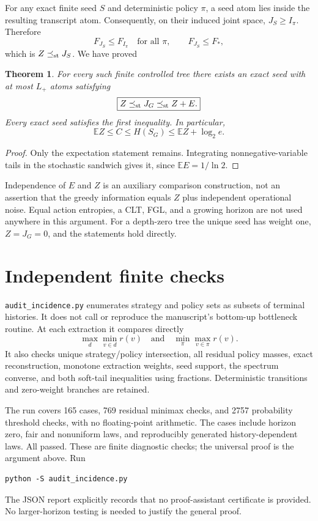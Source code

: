 \documentclass[11pt,a4paper]{article}
\newtheorem{theorem}[lemma]{Theorem}
\newcommand{\E}{\mathbb E}
\begin{document}
For any exact finite seed $S$ and deterministic policy $\pi$, a seed atom
lies inside the resulting transcript atom. Consequently, on their induced
joint space, $J_S\ge I_\pi$. Therefore
\[
F_{J_S}\le F_{I_\pi}\quad\text{for all }\pi,
\qquad F_{J_S}\le F_*,
\]
which is $Z\preceq_{\rm st}J_S$. We have proved
\begin{theorem}
For every such finite controlled tree there exists an exact seed with at
most $L_+$ atoms satisfying
\[
\boxed{Z\preceq_{\rm st}J_G\preceq_{\rm st}Z+E.}
\]
Every exact seed satisfies the first inequality. In particular,
\[
\boxed{\E Z\le C\le H(S_G)\le\E Z+\log_2e.}
\]
\end{theorem}
\begin{proof}
Only the expectation statement remains. Integrating nonnegative-variable
tails in the stochastic sandwich gives it, since $\E E=1/\ln2$.
\end{proof}
Independence of $E$ and $Z$ is an auxiliary comparison construction, not
an assertion that the greedy information equals $Z$ plus independent
operational noise. Equal action entropies, a CLT, FGL, and a growing horizon
are not used anywhere in this argument. For a depth-zero tree the unique
seed has weight one, $Z=J_G=0$, and the statements hold directly.

\section{Independent finite checks}
\texttt{audit\_incidence.py} enumerates strategy and policy sets as subsets
of terminal histories. It does not call or reproduce the manuscript's
bottom-up bottleneck routine. At each extraction it compares directly
\[
\max_d\min_{v\in d}r(v)
\quad\text{and}\quad
\min_\pi\max_{v\in\pi}r(v).
\]
It also checks unique strategy/policy intersection, all residual policy
masses, exact reconstruction, monotone extraction weights, seed support,
the spectrum converse, and both soft-tail inequalities using fractions.
Deterministic transitions and zero-weight branches are retained.

The run covers 165 cases, 769 residual minimax checks, and 2757 probability
threshold checks, with no floating-point arithmetic. The cases include
horizon zero, fair and nonuniform laws, and reproducibly generated
history-dependent laws. All passed. These are finite diagnostic checks;
the universal proof is the argument above. Run
\begin{verbatim}
python -S audit_incidence.py
\end{verbatim}
The JSON report explicitly records that no proof-assistant certificate is
provided. No larger-horizon testing is needed to justify the general proof.
\end{document}
